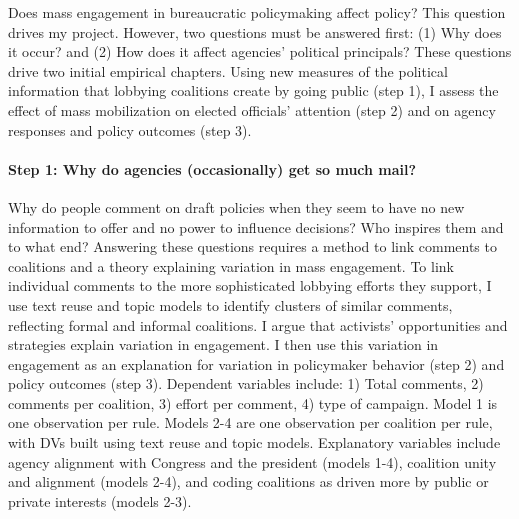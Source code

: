 Does mass engagement in bureaucratic policymaking affect policy? This question drives my project. However, two questions must be answered first: (1) Why does it occur? and (2) How does it affect agencies' political principals? These questions drive two initial empirical chapters.
Using new measures of the political information that lobbying coalitions create by going public (step 1), I assess the effect of mass mobilization on elected officials' attention (step 2) and on agency responses and policy outcomes (step 3).%

\paragraph{Step 1: Why do agencies (occasionally) get so much mail?} 



Why do people comment on draft policies when they seem to have no new information to offer and no power to influence decisions? Who inspires them and to what end? 
Answering these questions requires a method to link comments to coalitions and a theory explaining variation in mass engagement.  
To link individual comments to the more sophisticated lobbying efforts they support, I use text reuse and topic models to identify clusters of similar comments, reflecting formal and informal coalitions.
I argue that activists' opportunities and strategies explain variation in engagement. %
I then use this variation in engagement as an explanation for variation in policymaker behavior (step 2) and policy outcomes (step 3). 
Dependent variables include: 
1) Total comments, %
2) comments per coalition, %
3) effort per comment, %
4) type of campaign. %
Model 1 is one observation per rule. Models 2-4 are one observation per coalition per rule, with DVs built using text reuse and topic models. Explanatory variables include agency alignment with Congress and the president (models 1-4), coalition unity and alignment (models 2-4), and coding coalitions as driven more by public or private interests (models 2-3).%


